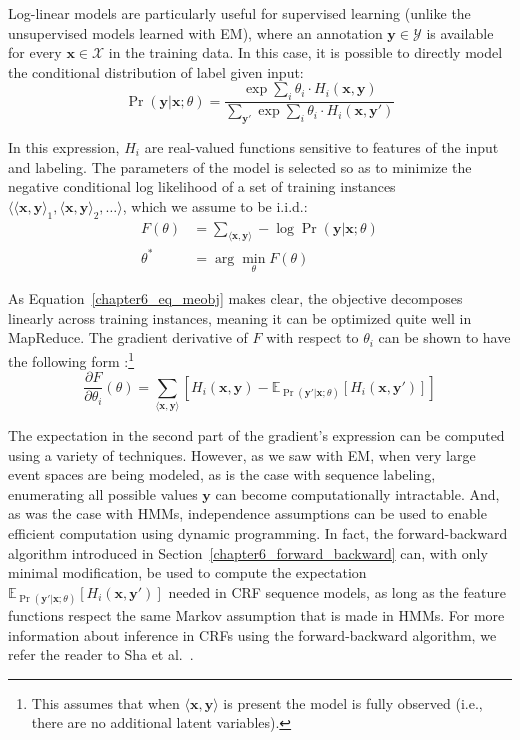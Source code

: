Log-linear models are particularly useful for supervised learning
(unlike the unsupervised models learned with EM), where an annotation
$\textbf{y} \in \mathcal{Y}$ is available for every $\textbf{x} \in
\mathcal{X}$ in the training data.  In this case, it is possible to
directly model the conditional distribution of label given input:
\begin{equation}
\Pr(\textbf{y} | \textbf{x} ; \theta) = \frac{\exp \sum_i \theta_i \cdot H_i(\textbf{x}, \textbf{y})}{\sum_{\textbf{y}'}\exp \sum_i \theta_i \cdot H_i(\textbf{x}, \textbf{y}')}
\end{equation}

\noindent In this expression, $H_i$ are real-valued functions
sensitive to features of the input and labeling.  The parameters of
the model is selected so as to minimize the negative conditional log
likelihood of a set of training instances $\langle \langle \textbf{x}
, \textbf{y} \rangle_1 , \langle \textbf{x} , \textbf{y} \rangle_2 ,
\ldots \rangle$, which we assume to be i.i.d.:
\begin{align}
F(\theta) & = \sum_{\langle \textbf{x} , \textbf{y} \rangle} - \log \Pr(\textbf{y} | \textbf{x} ; \theta) \label{chapter6_eq_meobj} \\
\theta^* & = \arg \min_\theta F(\theta)
\end{align}

\noindent As Equation~\ref{chapter6_eq_meobj} makes clear, the
objective decomposes linearly across training instances, meaning it
can be optimized quite well in MapReduce.  The gradient derivative of
$F$ with respect to $\theta_i$ can be shown to have the following form
\cite{Smith_2004}:\footnote{This assumes that when $\langle
  \textbf{x}, \textbf{y} \rangle$ is present the model is fully
  observed (i.e., there are no additional latent variables).}
\begin{equation}
\frac{\partial F}{\partial \theta_i}(\theta) = \sum_{\langle \textbf{x} , \textbf{y} \rangle} \left[ H_i(\textbf{x},\textbf{y}) - \mathbb{E}_{\Pr(\textbf{y}' | \textbf{x} ; \theta)}[H_i(\textbf{x},\textbf{y}')] \right]
\end{equation}

\noindent The expectation in the second part of the gradient's
expression can be computed using a variety of techniques.  However, as
we saw with EM, when very large event spaces are being modeled, as is
the case with sequence labeling, enumerating all possible values
$\textbf{y}$ can become computationally intractable.  And, as was the
case with HMMs, independence assumptions can be used to enable
efficient computation using dynamic programming.  In fact, the
forward-backward algorithm introduced in
Section~\ref{chapter6_forward_backward} can, with only minimal
modification, be used to compute the expectation
$\mathbb{E}_{\Pr(\textbf{y}' | \textbf{x} ;
  \theta)}[H_i(\textbf{x},\textbf{y}')]$ needed in CRF sequence
models, as long as the feature functions respect the same Markov
assumption that is made in HMMs.  For more information about inference
in CRFs using the forward-backward algorithm, we refer the reader to
Sha et al.~\cite{Sha_2003}.

